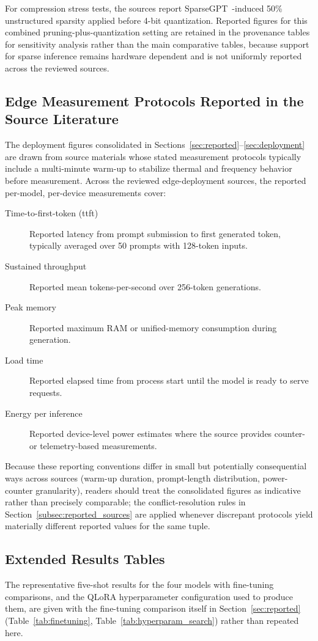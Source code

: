 For compression stress tests, the sources report SparseGPT~\citep{frantar2023sparsegpt}-induced 50\% unstructured sparsity applied before 4-bit quantization. Reported figures for this combined pruning-plus-quantization setting are retained in the provenance tables for sensitivity analysis rather than the main comparative tables, because support for sparse inference remains hardware dependent and is not uniformly reported across the reviewed sources.

\subsection{Edge Measurement Protocols Reported in the Source Literature}
\label{subsec:appendix_edge_protocol}
The deployment figures consolidated in Sections~\ref{sec:reported}--\ref{sec:deployment} are drawn from source materials whose stated measurement protocols typically include a multi-minute warm-up to stabilize thermal and frequency behavior before measurement. Across the reviewed edge-deployment sources, the reported per-model, per-device measurements cover:
\begin{description}
    \item[Time-to-first-token (\gls{ttft})] Reported latency from prompt submission to first generated token, typically averaged over 50 prompts with 128-token inputs.
    \item[Sustained throughput] Reported mean tokens-per-second over 256-token generations.
    \item[Peak memory] Reported maximum RAM or unified-memory consumption during generation.
    \item[Load time] Reported elapsed time from process start until the model is ready to serve requests.
    \item[Energy per inference] Reported device-level power estimates where the source provides counter- or telemetry-based measurements.
\end{description}
Because these reporting conventions differ in small but potentially consequential ways across sources (warm-up duration, prompt-length distribution, power-counter granularity), readers should treat the consolidated figures as indicative rather than precisely comparable; the conflict-resolution rules in Section~\ref{subsec:reported_sources} are applied whenever discrepant protocols yield materially different reported values for the same tuple.

\subsection{Extended Results Tables}
\label{subsec:appendix_extended_results}
The representative five-shot results for the four models with fine-tuning
comparisons, and the QLoRA hyperparameter configuration used to produce them, are
given with the fine-tuning comparison itself in Section~\ref{sec:reported}
(Table~\ref{tab:finetuning}, Table~\ref{tab:hyperparam_search}) rather than
repeated here.

